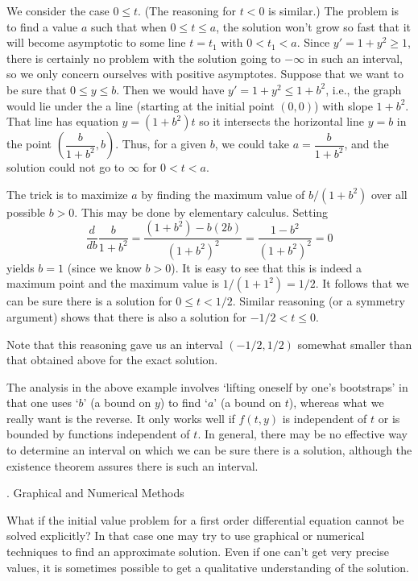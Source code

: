   We consider the case $0 \le t$.  (The reasoning for
$t < 0$ is similar.)  The problem is to find a value $a$ such
that when $0 \le t \le a$, the solution won't grow so fast that
it will become asymptotic to some line $t = t_1$ with $0< t_1 < a$.
Since $y' = 1 + y^2 \ge 1$, there is certainly no problem with
the solution going to $-\infty$ in such an interval, so we only
concern ourselves with positive asymptotes.  Suppose that
we want to be sure that $0\le y \le b$.   Then we would have
$y' = 1 + y^2 \le 1 + b^2$, i.e., the graph would lie under the
a line (starting at the initial point $(0,0)$) with slope
$1 + b^2$.   That line has equation $y = (1 + b^2)t$
so it intersects the horizontal line
$y = b$ in the point $(\dfrac{b}{1 + b^2}, b)$.  Thus, for a given
$b$, we could take $a = \dfrac{b}{1 + b^2}$, and the solution 
 could not go to $\infty$ for $0 < t < a$.

The trick is to maximize $a$ by 
finding the maximum value of $b/(1 + b^2)$ over all possible
$b > 0$.   This may be done by
elementary calculus. Setting
$$
\frac{d}{db}\frac b{1 + b^2} =  \frac{(1 + b^2) - b(2b)}{(1 + b^2)^2}
  = \frac{1 - b^2}{(1 + b^2)^2} = 0
$$
yields $b = 1$ (since we know $b > 0$).  It is easy to see that this
is indeed a maximum point and the maximum value is $1/(1 + 1^2) = 1/2$.
It follows that we can be sure there is a solution for $0 \le t < 1/2$.
Similar reasoning (or a symmetry argument) shows that there is also
a solution for $-1/2 < t \le 0$.

Note that this reasoning gave us an interval $(-1/2,1/2)$ somewhat
smaller than that obtained above for the exact solution.
\endexample

\centerline{}
\bigskip
The analysis in the above example involves
`lifting oneself by one's bootstraps' in that one uses `$b$' (a bound
on $y$) to find `$a$' (a bound on $t$), whereas what we really
want is the reverse.  It only
works well if $f(t,y)$ is
independent of $t$ or is bounded by functions independent
of $t$.  In general,  there may be no effective way to determine
an interval on which we can be sure there is a solution, although
the existence theorem assures there is such an interval. 

\bigskip

\bigskip

\head \sn. Graphical and Numerical Methods \endhead

What if the initial value problem for
a first order differential equation cannot be solved
explicitly?   In that case one may try to use graphical
or numerical techniques to find an approximate solution.
Even if one can't get very precise values, it is
sometimes possible to get a qualitative understanding
of the solution.

